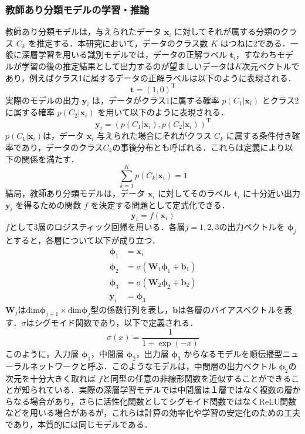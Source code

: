 \subsubsection{教師あり分類モデルの学習・推論}\label{sec:supervisedClassification}
教師あり分類モデルは，与えられたデータ $\bm{x}_i$ に対してそれが属する分類のクラス $C_k$ を推定する．本研究において，データのクラス数 $K$ はつねに2である．一般に深層学習を用いる識別モデルでは，データの正解ラベル $\bm{t}_i$，すなわちモデルが学習の後の推定結果として出力するのが望ましいデータは$K$次元ベクトルであり，例えばクラス1に属するデータの正解ラベルは以下のように表現される．
\begin{equation}
    \bm{t} = \left( 1, 0 \right)^\mathrm{T}
\end{equation}
実際のモデルの出力 $\bm{y}_i$ は，データがクラス1に属する確率 $p(C_1|\bm{x}_i)$ とクラス2に属する確率 $p(C_2|\bm{x}_i)$ を用いて以下のように表現される．
\begin{equation}
    \bm{y}_i = \left( p(C_1|\bm{x}_i), p(C_2|\bm{x}_i) \right)^\mathrm{T}
\end{equation}
$p(C_k|\bm{x}_i)$は，データ $\bm{x}_i$ 与えられた場合にそれがクラス $C_k$ に属する条件付き確率であり，データのクラス$C_k$の事後分布とも呼ばれる．これらは定義により以下の関係を満たす．
\begin{equation}
    \sum_{k=1}^K p(C_k|\bm{x}_i) = 1
\end{equation}
結局，教師あり分類モデルは，データ $\bm{x}_i$ に対してそのラベル $\bm{t}_i$ に十分近い出力 $\bm{y}_i$ を得るための関数 $f$ を決定する問題として定式化できる．
\begin{equation}
    \bm{y}_i = f(\bm{x}_i)
\end{equation}
$f$として3層のロジスティック回帰を用いる．各層$j = 1,2,3$の出力ベクトルを $\bm{\phi}_j$ とすると，各層について以下が成り立つ．
\begin{align}
    \bm{\phi}_1 &= \bm{x}_i \\
    \bm{\phi}_2 &= \sigma(\bm{W}_1 \bm{\phi}_1 + \bm{b}_1) \\
    \bm{\phi}_3 &= \sigma(\bm{W}_2 \bm{\phi}_2 + \bm{b}_2) \\
    \bm{y}_i &= \bm{\phi}_3
\end{align}
$\bm{W}_j$は$\mathrm{dim}\bm{\phi}_{j+1}\times \mathrm{dim}\bm{\phi}_{j}$型の係数行列を表し，$\bm{b}$は各層のバイアスベクトルを表す．$\sigma$はシグモイド関数であり，以下で定義される．
\begin{equation}
    \sigma(x) = \frac{1}{1+\exp{(-x)}}
\end{equation}
このように，入力層 $\bm{\phi}_1$，中間層 $\bm{\phi}_2$，出力層 $\bm{\phi}_3$ からなるモデルを順伝播型ニューラルネットワークと呼ぶ．このようなモデルは，中間層の出力ベクトル $\bm{\phi}_2$の次元を十分大きく取れば $f$と同型の任意の非線形関数を近似することができることが知られている\cite{cybenko1989}．実際の深層学習モデルでは中間層は１層ではなく複数の層からなる場合があり，さらに活性化関数としてシグモイド関数ではなくReLU関数\cite{nair2010}などを用いる場合があるが，これらは計算の効率化や学習の安定化のための工夫であり，本質的には同じモデルである．


